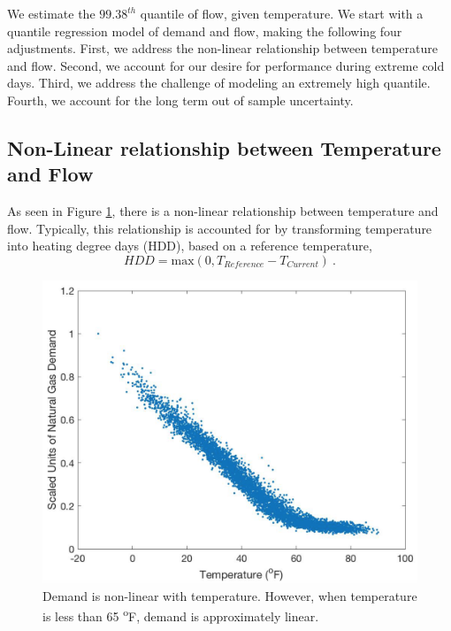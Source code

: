 \documentclass{article}
\begin{document}
We estimate the $99.38^{th}$ quantile of flow, given temperature. We start with a quantile regression model of demand and flow, making the following four adjustments. First, we address the non-linear relationship between temperature and flow. Second, we account for our desire for performance during extreme cold days. Third, we address the challenge of modeling an extremely high quantile. Fourth, we account for the long term out of sample uncertainty.

\subsection{Non-Linear relationship between Temperature and Flow}

As seen in Figure \ref{fig:scatterTempAndFlow}, there is a non-linear relationship between temperature and flow. Typically, this relationship is accounted for by transforming temperature into heating degree days (HDD), based on a reference temperature, 
\begin{equation}
    HDD= \mbox{max}(0, T_{Reference}-T_{Current})~.
    \label{eqn:hdd}
\end{equation}

\begin{figure} \label{fig:scatterTempAndFlow}
	\centering
	\includegraphics[scale=0.4]{nonlinear.png}
	\caption{Demand is non-linear with temperature. However, when temperature is less than 65 \textsuperscript{o}F, demand is approximately linear.}
\end{figure}
\end{document}
